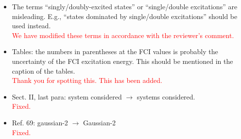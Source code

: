 \documentclass[10pt]{letter}
\newcommand{\alert}[1]{\textcolor{red}{#1}}
\begin{document}
\begin{letter}
\begin{itemize}
	\item 
	{The terms ``singly/doubly-excited states'' or ``single/double excitations'' are misleading. 
	E.g., ``states dominated by single/double excitations'' should be used instead. }
	\\
	\alert{We have modified these terms in accordance with the reviewer's comment.}
	
	\item 
	{Tables: the numbers in parentheses at the FCI values is probably the uncertainty of the FCI excitation energy. 
	This should be mentioned in the caption of the tables. }
	\\
	\alert{Thank you for spotting this. This has been added.}
	
	\item 
	{Sect. II, last para: system considered $\to$ systems considered.}
	\\
	\alert{Fixed.}

	\item 
	{Ref. 69: gaussian-2 $\to$ Gaussian-2}
	\\
	\alert{Fixed.}
		
\end{itemize}

 
\end{letter}
\end{document}
